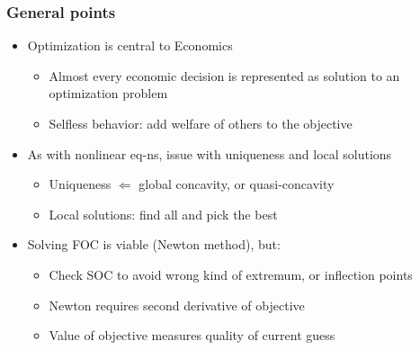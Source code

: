\documentclass[bigger]{beamer}
\begin{document}
\begin{frame}%
\frametitle{General points}

\begin{itemize}
\item Optimization is central to Economics

\begin{itemize}
\item Almost every economic decision is represented as solution to an optimization
problem

\item Selfless behavior: add welfare of others to the objective
\end{itemize}

\item As with nonlinear eq-ns, issue with uniqueness and local solutions

\begin{itemize}
\item Uniqueness $\Leftarrow $ global concavity, or quasi-concavity

\item Local solutions: find all and pick the best
\end{itemize}

\item Solving FOC is viable (Newton method), but:

\begin{itemize}
\item Check SOC to avoid wrong kind of extremum, \newline
or inflection points

\item Newton requires second derivative of objective

\item Value of objective measures quality of current guess
\end{itemize}
\end{itemize}

\end{frame}%
\end{document}
